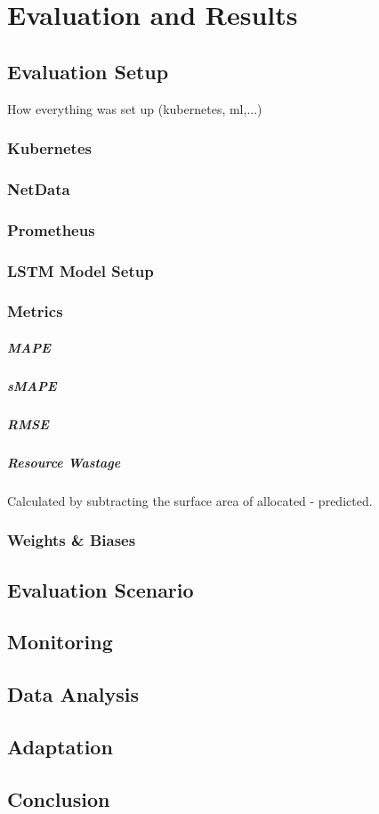 \chapter{Evaluation and Results}

\section{Evaluation Setup}
  How everything was set up (kubernetes, ml,...)
  \subsection{Kubernetes}
  \subsection{NetData}
  \subsection{Prometheus}
  \subsection{LSTM Model Setup}
  \subsection{Metrics}

    \paragraph{MAPE}
    \paragraph{sMAPE}
    \paragraph{RMSE}
    \paragraph{Resource Wastage}
      Calculated by subtracting the surface area of allocated - predicted.
  \subsection{Weights \& Biases}
\section{Evaluation Scenario}
\section{Monitoring}
\section{Data Analysis}
\section{Adaptation}
\section{Conclusion}